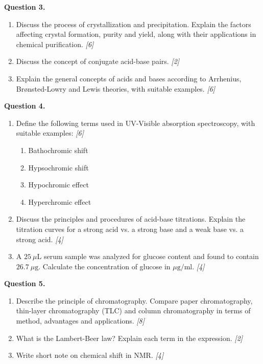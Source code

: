 \documentclass[11pt,a4paper]{article}
\newcommand{\pts}[1]{\hfill \textit{[#1]}}
\begin{document}
\bigskip

\noindent \textbf{Question 3.}
\begin{enumerate}[label=(\alph*)]
  \item Discuss the process of crystallization and precipitation. Explain the factors affecting crystal formation, purity and yield, along with their applications in chemical purification. \pts{6}
  \item Discuss the concept of conjugate acid-base pairs. \pts{2}
  \item Explain the general concepts of acids and bases according to Arrhenius, Brønsted-Lowry and Lewis theories, with suitable examples. \pts{6}
\end{enumerate}

\bigskip

\noindent \textbf{Question 4.}
\begin{enumerate}[label=(\alph*)]
  \item Define the following terms used in UV-Visible absorption spectroscopy, with suitable examples: \pts{6}
  \begin{enumerate}[label=(\roman*)]
    \item Bathochromic shift
    \item Hypsochromic shift
    \item Hypochromic effect
    \item Hyperchromic effect
  \end{enumerate}
  \item Discuss the principles and procedures of acid-base titrations. Explain the titration curves for a strong acid vs. a strong base and a weak base vs. a strong acid. \pts{4}
  \item A $25\ \mu\text{L}$ serum sample was analyzed for glucose content and found to contain $26.7\ \mu\text{g}$. Calculate the concentration of glucose in $\mu\text{g/ml}$. \pts{4}
\end{enumerate}

\bigskip

\noindent \textbf{Question 5.}
\begin{enumerate}[label=(\alph*)]
  \item Describe the principle of chromatography. Compare paper chromatography, thin-layer chromatography (TLC) and column chromatography in terms of method, advantages and applications. \pts{8}
  \item What is the Lambert-Beer law? Explain each term in the expression. \pts{2}
  \item Write short note on chemical shift in NMR. \pts{4}
\end{enumerate}
\end{document}

